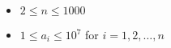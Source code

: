\begin{itemize}
\tightlist
\item $2 \leq n \leq 1000$
\item $1 \leq a_i \leq 10^7$ for $i = 1, 2, \ldots, n$
\end{itemize}
